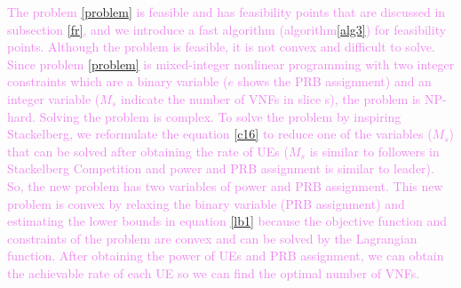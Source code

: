 \documentclass[lettersize,journal]{IEEEtran}
\begin{document}
\textcolor{violet}{The problem \ref{problem} is feasible and has feasibility points that are discussed in subsection \ref{fr}, and we introduce a fast algorithm (algorithm\ref{alg3}) for feasibility points. Although the problem is feasible, it is not convex and difficult to solve. Since problem \eqref{problem} is mixed-integer nonlinear programming with two integer constraints which are a binary variable ($e$ shows the PRB assignment) and an integer variable ($M_s$ indicate the number of VNFs in slice s), the problem is NP-hard. Solving the problem is complex. To solve the problem by inspiring Stackelberg, we reformulate the equation \eqref{c16} to reduce one of the variables ($M_s$) that can be solved after obtaining the rate of UEs ($M_s$ is similar to followers in Stackelberg Competition and power and PRB assignment is similar to leader). So, the new problem has two variables of power and PRB assignment. This new problem is convex by relaxing the binary variable (PRB assignment) and estimating the lower bounds in equation \eqref{lb1} because the objective function and constraints of the problem are convex and can be solved by the Lagrangian function. After obtaining the power of UEs and PRB assignment, we can obtain the achievable rate of each UE so we can find the optimal number of VNFs.}
\end{document}
